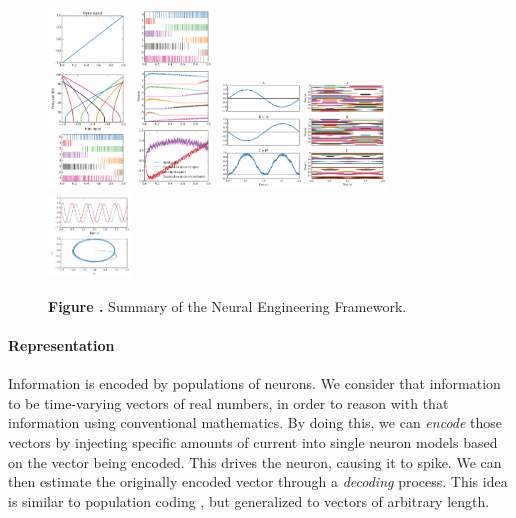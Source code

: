 \documentclass{frontiersSCNS}
\begin{document}
\begin{figure}
\begin{center}
  \includegraphics[width=0.19\textwidth]{nef_summary_enc}
  \includegraphics[width=0.19\textwidth]{nef_summary_dec}
  \includegraphics[width=0.399\textwidth]{nef_summary_trans}
  \includegraphics[width=0.199\textwidth]{nef_summary_dyn}
\end{center}
 \textbf{\label{fig:nef} Figure .}{
   Summary of the Neural Engineering Framework.}
\end{figure}

\paragraph{Representation}
Information is encoded by populations of neurons.
We consider that information
to be time-varying vectors of real numbers,
in order to reason with that information
using conventional mathematics.
By doing this, we can \textit{encode}
those vectors by injecting
specific amounts of current into
single neuron models based on
the vector being encoded.
This drives the neuron,
causing it to spike.
We can then estimate
the originally encoded vector
through a \textit{decoding} process.
This idea is similar to population coding
\cite{TODO}, but generalized
to vectors of arbitrary length.
\end{document}
